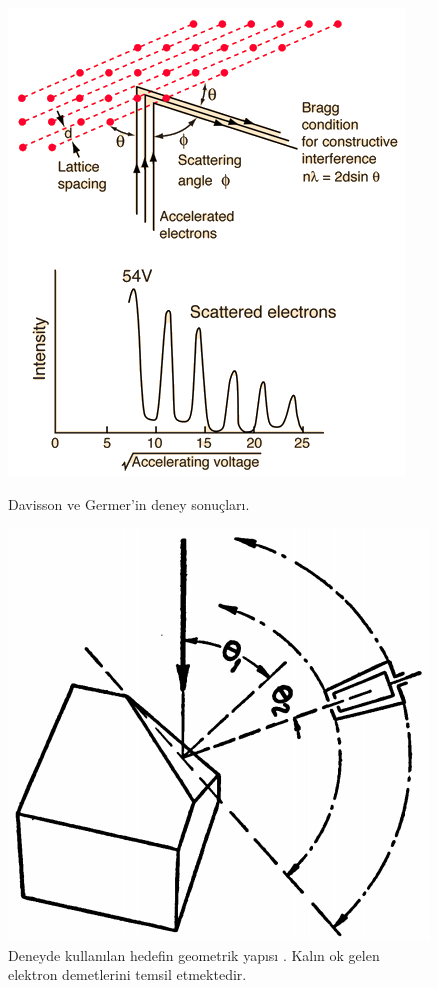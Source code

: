 \documentclass[a4paper,12pt, twoside]{article}
\begin{document}
\begin{figure}[hbtp]
\center
\begin{minipage}{0.45\textwidth}
\includegraphics[scale=.8]{davisson_germer_hyperphysics.png}
\caption{Davisson ve Germer'in deney sonuçları\cite{web:hyperphysics_davisson_germer1}.}
\label{fig:davisson_germer3}
\end{minipage}
\hspace{24pt}
\begin{minipage}{0.35\textwidth}
\includegraphics[scale=.35]{Davisson-Germer_experiment_nickel_target.png}
\caption{\label{fig:davisson_germer4} Deneyde kullanılan hedefin geometrik yapısı \cite{DavissonGermer}. Kalın ok gelen elektron demetlerini temsil etmektedir.}


\end{minipage}
\end{figure}
\end{document}
